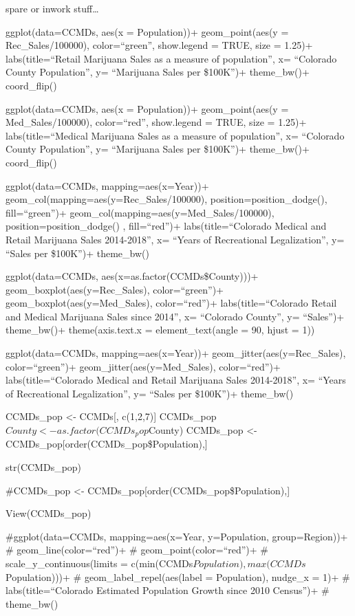 \documentclass[]{article}
\begin{document}
spare or inwork stuff\ldots{}

ggplot(data=CCMDs, aes(x = Population))+ geom\_point(aes(y =
Rec\_Sales/100000), color=``green'', show.legend = TRUE, size = 1.25)+
labs(title=``Retail Marijuana Sales as a measure of population'', x=
``Colorado County Population'', y= ``Marijuana Sales per \$100K'')+
theme\_bw()+ coord\_flip()

ggplot(data=CCMDs, aes(x = Population))+ geom\_point(aes(y =
Med\_Sales/100000), color=``red'', show.legend = TRUE, size = 1.25)+
labs(title=``Medical Marijuana Sales as a measure of population'', x=
``Colorado County Population'', y= ``Marijuana Sales per \$100K'')+
theme\_bw()+ coord\_flip()

ggplot(data=CCMDs, mapping=aes(x=Year))+
geom\_col(mapping=aes(y=Rec\_Sales/100000), position=position\_dodge(),
fill=``green'')+ geom\_col(mapping=aes(y=Med\_Sales/100000),
position=position\_dodge() , fill=``red'')+ labs(title=``Colorado
Medical and Retail Marijuana Sales 2014-2018'', x= ``Years of
Recreational Legalization'', y= ``Sales per \$100K'')+ theme\_bw()

ggplot(data=CCMDs, aes(x=as.factor(CCMDs\$County)))+
geom\_boxplot(aes(y=Rec\_Sales), color=``green'')+
geom\_boxplot(aes(y=Med\_Sales), color=``red'')+ labs(title=``Colorado
Retail and Medical Marijuana Sales since 2014'', x= ``Colorado County'',
y= ``Sales'')+ theme\_bw()+ theme(axis.text.x = element\_text(angle =
90, hjust = 1))

ggplot(data=CCMDs, mapping=aes(x=Year))+ geom\_jitter(aes(y=Rec\_Sales),
color=``green'')+ geom\_jitter(aes(y=Med\_Sales), color=``red'')+
labs(title=``Colorado Medical and Retail Marijuana Sales 2014-2018'', x=
``Years of Recreational Legalization'', y= ``Sales per \$100K'')+
theme\_bw()

CCMDs\_pop \textless{}- CCMDs{[}, c(1,2,7){]}
CCMDs\_pop\(County <- as.factor(CCMDs_pop\)County) CCMDs\_pop
\textless{}- CCMDs\_pop{[}order(CCMDs\_pop\$Population),{]}

str(CCMDs\_pop)

\#CCMDs\_pop \textless{}- CCMDs\_pop{[}order(CCMDs\_pop\$Population),{]}

View(CCMDs\_pop)

\#ggplot(data=CCMDs, mapping=aes(x=Year, y=Population, group=Region))+
\# geom\_line(color=``red'')+ \# geom\_point(color=``red'')+ \#
scale\_y\_continuous(limits =
c(min(CCMDs\(Population), max(CCMDs\)Population)))+ \#
geom\_label\_repel(aes(label = Population), nudge\_x = 1)+ \#
labs(title=``Colorado Estimated Population Growth since 2010 Census'')+
\# theme\_bw()
\end{document}
